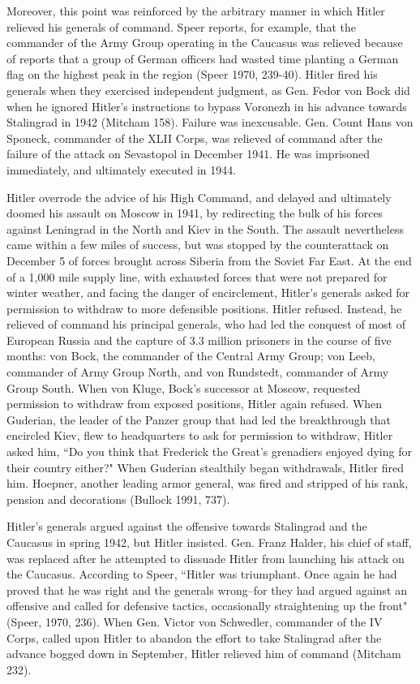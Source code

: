 \documentclass[11pt,]{article}
\begin{document}
Moreover, this point was reinforced by the arbitrary manner in which Hitler relieved his generals of command.  Speer reports, for example, that the commander of the Army Group operating in the Caucasus was relieved because of reports that a group of German officers had wasted time planting a German flag on the highest peak in the region (Speer 1970, 239-40).  Hitler fired his generals when they exercised independent judgment, as Gen. Fedor von Bock did when he ignored Hitler's instructions to bypass Voronezh in his advance towards Stalingrad in 1942 (Mitcham 158).  Failure was inexcusable.  Gen. Count Hans von Sponeck, commander of the XLII Corps, was relieved of command after the failure of the attack on Sevastopol in December 1941.  He was imprisoned immediately, and ultimately executed in 1944.  



Hitler overrode the advice of his High Command, and delayed and ultimately doomed his assault on Moscow in 1941, by redirecting the bulk of his forces against Leningrad in the North and Kiev in the South.  The assault nevertheless came within a few miles of success, but was stopped by the counterattack on December 5 of forces brought across Siberia from the Soviet Far East.  At the end of a 1,000 mile supply line, with exhausted forces that were not prepared for winter weather, and facing the danger of encirclement, Hitler's generals asked for permission to withdraw to more defensible positions.  Hitler refused.  Instead, he relieved of command his principal generals, who had led the conquest of most of European Russia and the capture of 3.3 million prisoners in the course of five months:  von Bock, the commander of the Central Army Group; von Leeb, commander of Army Group North, and von Rundstedt, commander of Army Group South.  When von Kluge, Bock's successor at Moscow, requested permission to withdraw from exposed positions, Hitler again refused.  When Guderian, the leader of the Panzer group that had led the breakthrough that encircled Kiev, flew to headquarters to ask for permission to withdraw, Hitler asked him, ``Do you think that Frederick the Great's grenadiers enjoyed dying for their country either?"  When Guderian stealthily began withdrawals, Hitler fired him.  Hoepner, another leading armor general, was fired and stripped of his rank, pension and decorations (Bullock 1991, 737).



Hitler's generals argued against the offensive towards Stalingrad and the Caucasus in spring 1942, but Hitler insisted.  Gen. Franz Halder, his chief of staff, was replaced after he attempted to dissuade Hitler from launching his attack on the Caucasus.  According to Speer, ``Hitler was triumphant.  Once again he had proved that he was right and the generals wrong--for they had argued against an offensive and called for defensive tactics, occasionally straightening up the front" (Speer, 1970, 236).  When Gen. Victor von Schwedler, commander of the IV Corps, called upon Hitler to abandon the effort to take Stalingrad after the advance bogged down in September, Hitler relieved him of command (Mitcham 232).  
\end{document}
